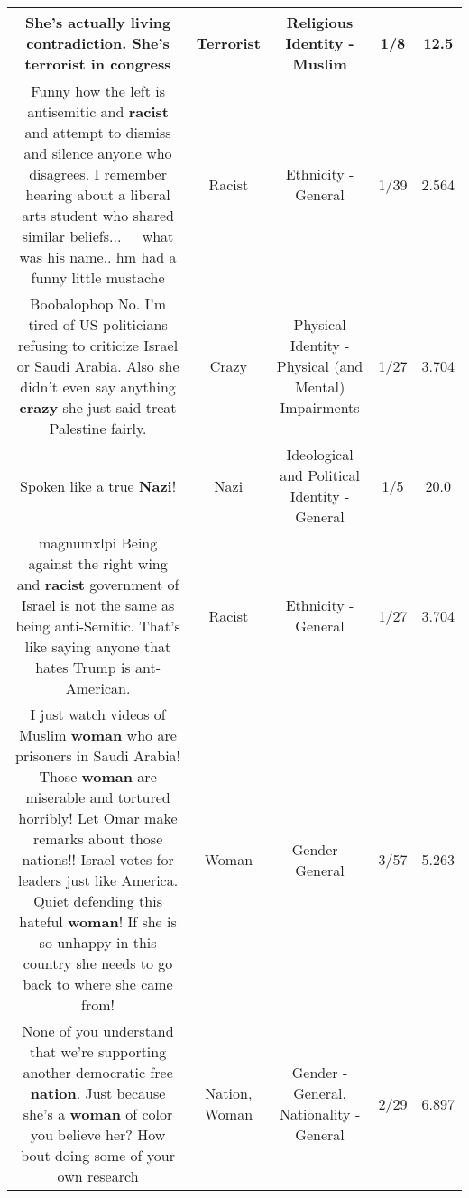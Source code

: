 \documentclass[11pt]{article}
\newlength\mylength
\begin{document}
\begin{center}
\begin{longtable}{|C{.65\mylength}|C{.30\mylength}|C{.12\mylength}|C{.12\mylength}|C{.12\mylength}|}
  \small She's actually living contradiction. She's \textbf{terrorist} in congress\normalsize   & Terrorist & Religious Identity - Muslim & 1/8 & 12.5 \\  \hline
  \small Funny how the left is antisemitic and \textbf{racist} and attempt to dismiss and silence anyone who disagrees. I remember hearing about a liberal arts student who shared similar beliefs... 🤔🤔🤔🤔what was his name.. hm had a funny little mustache\normalsize   & Racist & Ethnicity - General & 1/39 & 2.564 \\  \hline
  \small Boobalopbop No. I'm tired of US politicians refusing to criticize Israel or Saudi Arabia. Also she didn't even say anything \textbf{crazy} she just said treat Palestine fairly.\normalsize   & Crazy & Physical Identity - Physical (and Mental) Impairments & 1/27 & 3.704 \\  \hline
  \small Spoken like a true \textbf{Nazi}!\normalsize   & Nazi &  Ideological and Political Identity - General & 1/5 & 20.0 \\  \hline
  \small magnumxlpi Being against the right wing and \textbf{racist} government of Israel is not the same as being anti-Semitic. That's like saying anyone that hates Trump is ant-American.\normalsize   & Racist & Ethnicity - General & 1/27 & 3.704 \\  \hline
  \small I just watch videos of Muslim \textbf{woman} who are prisoners in Saudi Arabia! Those \textbf{woman} are miserable and tortured horribly! Let Omar make remarks about those nations!! Israel votes for leaders just like America. Quiet defending this hateful \textbf{woman}! If she is so unhappy in this country she needs to go back to where she came from!\normalsize   & Woman & Gender - General & 3/57 & 5.263 \\  \hline
  \small None of you understand that we're supporting another democratic free \textbf{nation}. Just because she's a \textbf{woman} of color you believe her? How bout doing some of your own research\normalsize   & Nation, Woman & Gender - General, Nationality - General & 2/29 & 6.897 \\  \hline

\end{longtable}
\end{center}
\end{document}
